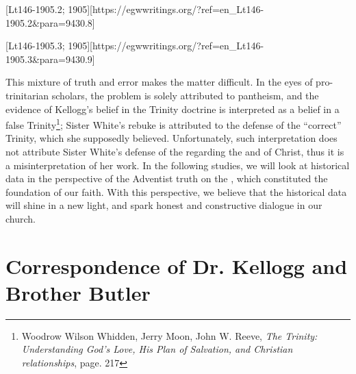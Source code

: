 [Lt146-1905.2; 1905][https://egwwritings.org/?ref=en\_Lt146-1905.2&para=9430.8]

[Lt146-1905.3; 1905][https://egwwritings.org/?ref=en\_Lt146-1905.3&para=9430.9]

This mixture of truth and error makes the matter difficult. In the eyes of pro-trinitarian scholars, the problem is solely attributed to pantheism, and the evidence of Kellogg’s belief in the Trinity doctrine is interpreted as a belief in a false Trinity\footnote{Woodrow Wilson Whidden, Jerry Moon, John W. Reeve, \textit{The Trinity: Understanding God's Love, His Plan of Salvation, and Christian relationships}, page. 217}; Sister White’s rebuke is attributed to the defense of the “correct” Trinity, which she supposedly believed. Unfortunately, such interpretation does not attribute Sister White’s defense of the  regarding the  and of Christ, thus it is a misinterpretation of her work. In the following studies, we will look at historical data in the perspective of the Adventist truth on the , which constituted the foundation of our faith. With this perspective, we believe that the historical data will shine in a new light, and spark honest and constructive dialogue in our church.

\section*{Correspondence of Dr. Kellogg and Brother Butler}

